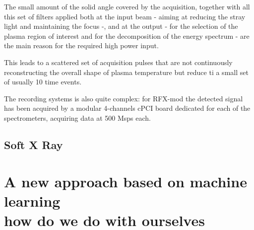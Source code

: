 The small amount of the solid angle covered by the acquisition, together with all this set of filters applied both at the input beam - aiming at reducing the stray light and maintaining the focus -, and at the output - for the selection of the plasma region of interest and for the decomposition of the energy spectrum - are the main reason for the required high power input.

This leads to a scattered set of acquisition pulses that are not continuously reconstructing the overall shape of plasma temperature but reduce ti a small set of usually 10 time events.

The recording systems is also quite complex: for RFX-mod the detected signal has been acquired by a modular 4-channels cPCI board dedicated for each of the spectrometers, acquiring data at 500 Msps each.

\subsection{Soft X Ray}


\section{A new approach based on machine learning \\ \small{ how do we do with ourselves }}
\cite{Goodfellow-et-al-2016}


